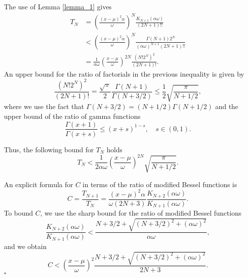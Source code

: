 \documentclass[10pt,a4paper,oneside]{article}
\newenvironment{proof}{\noindent{\bf Proof:}}{\hfill$\square$}
\numberwithin{equation}{section}
\begin{document}
\begin{proof}
The use of Lemma \ref{lemma_1} gives
\begin{align*}
T_N &= \left(\frac{(x-\mu)^2 \alpha}{\omega}\right)^N \frac{K_{N+1}(\alpha \omega)}{(2N +1)!!}\\
&<  \left(\frac{(x-\mu)^2 \alpha}{\omega}\right)^N \frac{\Gamma(N + 1)2^N}{(\alpha\omega)^{N + 1}(2N +1)!!}\\
&= \frac{1}{\alpha\omega}\left(\frac{x-\mu}{\omega}\right)^{2N} \frac{(N! 2^N)^2}{(2N + 1)!}.
\end{align*}
An upper bound for the ratio of factorials in the previous inequality is given by
\begin{equation*}
\frac{(N! 2^N)^2}{(2N + 1)!} = \frac{\sqrt{\pi}}{2}\frac{\Gamma(N+1)}{\Gamma(N + 3/2)} \le \frac{1}{2}\sqrt{\frac{\pi}{N + 1/2}},
\end{equation*}
where we use the fact that $\Gamma(N + 3/2) = (N + 1/2) \Gamma(N + 1/2)$ and the upper bound of the ratio of gamma functions \cite{Wendel1948}
\begin{equation}
\frac{\Gamma(x + 1)}{\Gamma(x+s)} \le (x + s)^{1-s}, \quad s \in (0, 1).
\end{equation}

Thus, the following bound for $T_N$ holds
\begin{equation}
T_N < \frac{1}{2\alpha\omega}\left(\frac{x-\mu}{\omega}\right)^{2N} \sqrt{\frac{\pi}{N + 1/2}}.
\end{equation}

An explicit formula for $C$ in terms of the ratio of modified Bessel functions is
\begin{equation}
C = \frac{T_{N+1}}{T_N} = \frac{(x-\mu)^2 \alpha}{\omega (2N + 3)} \frac{K_{N+2}(\alpha\omega)}{K_{N+1}(\alpha\omega)}.
\end{equation}
To bound $C$, we use the sharp bound for the ratio of modified Bessel functions \cite{Segura2023}
\begin{equation}
\frac{K_{N+2}(\alpha\omega)}{K_{N+1}(\alpha\omega)} < \frac{N + 3/2 + \sqrt{(N + 3/2)^2 + (\alpha\omega)^2}}{\alpha \omega},
\end{equation}
and we obtain
\begin{equation*}
C < \left(\frac{x-\mu}{\omega}\right)^2 \frac{N + 3/2 + \sqrt{(N + 3/2)^2 + (\alpha\omega)^2}}{2N + 3}.
\end{equation*}
\end{proof}
\end{document}

